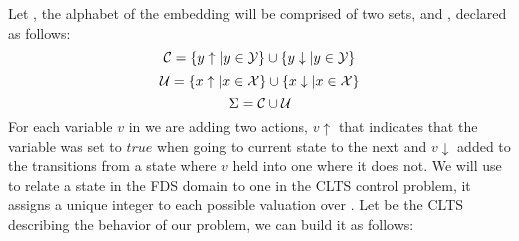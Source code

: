 %
Let \fdsControlProblemDef, the alphabet of the embedding will be comprised of two sets, \controlSet and \nonControlSet, declared as follows:
\[\mathcal{C} = \{y\uparrow | y \in {\ensuremath{\mathcal{Y}}} \} \cup \{y\downarrow | y \in {\ensuremath{\mathcal{Y}}} \}\]
\[\mathcal{U} = \{x\uparrow | x \in {\ensuremath{\mathcal{X}}} \} \cup \{x\downarrow | x \in {\ensuremath{\mathcal{X}}} \}\]
\[\Sigma = \mathcal{C} \cup \mathcal{U} \]
For each variable $v$ in \fdsControlProblem we are adding two actions, $v\uparrow$ that indicates that the variable was set to $true$ when going to current state to the next and $v\downarrow$ added to the transitions from a state where $v$ held into one where it does not.
We will use \enumStateSetDef to relate a state in the FDS domain to one in the CLTS control problem, it assigns a unique integer to each possible valuation over \gsV.
Let \cltsDef be the CLTS describing the behavior of our problem, we can build it as follows:

